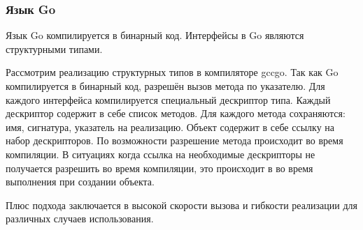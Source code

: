 \subsubsection{Язык Go}
Язык Go компилируется в бинарный код. Интерфейсы в Go являются структурными типами\cite{go}.

Рассмотрим реализацию структурных типов в компиляторе gccgo. Так как Go компилируется в бинарный код, разрешён вызов метода по указателю. Для каждого интерфейса компилируется специальный дескриптор типа. Каждый дескриптор содержит в себе список методов. Для каждого метода сохраняются: имя, сигнатура, указатель на реализацию. Объект содержит в себе ссылку на набор дескрипторов. По возможности разрешение метода происходит во время компиляции. В ситуациях когда ссылка на необходимые дескрипторы не получается разрешить во время компиляции, это происходит в во время выполнения при создании объекта.

Плюс подхода заключается в высокой скорости вызова и гибкости реализации для различных случаев использования.
